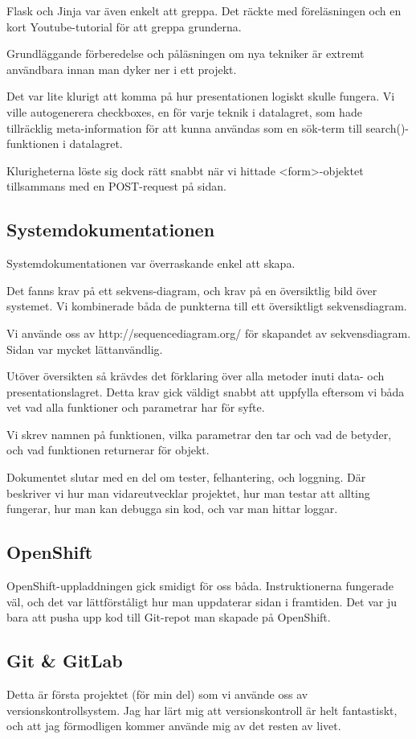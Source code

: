 \documentclass{TDP003mall}
\begin{document}
Flask och Jinja var även enkelt att greppa. Det räckte med föreläsningen och en kort Youtube-tutorial för att greppa grunderna.

Grundläggande förberedelse och påläsningen om nya tekniker är extremt användbara innan man dyker ner i ett projekt.

Det var lite klurigt att komma på hur presentationen logiskt skulle fungera. Vi ville autogenerera checkboxes, en för varje teknik i datalagret, som hade tillräcklig meta-information för att kunna användas som en sök-term till search()-funktionen i datalagret.

Klurigheterna löste sig dock rätt snabbt när vi hittade <form>-objektet tillsammans med en POST-request på sidan.

\subsection{Systemdokumentationen}
Systemdokumentationen var överraskande enkel att skapa.

Det fanns krav på ett sekvens-diagram, och krav på en översiktlig bild över systemet. Vi kombinerade båda de punkterna till ett översiktligt sekvensdiagram.

Vi använde oss av http://sequencediagram.org/ för skapandet av sekvensdiagram. Sidan var mycket lättanvändlig.

Utöver översikten så krävdes det förklaring över alla metoder inuti data- och presentationslagret. Detta krav gick väldigt snabbt att uppfylla eftersom vi båda vet vad alla funktioner och parametrar har för syfte.

Vi skrev namnen på funktionen, vilka parametrar den tar och vad de betyder, och vad funktionen returnerar för objekt.

Dokumentet slutar med en del om tester, felhantering, och loggning. Där beskriver vi hur man vidareutvecklar projektet, hur man testar att allting fungerar, hur man kan debugga sin kod, och var man hittar loggar. 

\subsection{OpenShift}
OpenShift-uppladdningen gick smidigt för oss båda. Instruktionerna fungerade väl, och det var lättförståligt hur man uppdaterar sidan i framtiden. Det var ju bara att pusha upp kod till Git-repot man skapade på OpenShift.

\subsection{Git \& GitLab}
Detta är första projektet (för min del) som vi använde oss av versionskontrollsystem. Jag har lärt mig att versionskontroll är helt fantastiskt, och att jag förmodligen kommer använde mig av det resten av livet.
\end{document}
